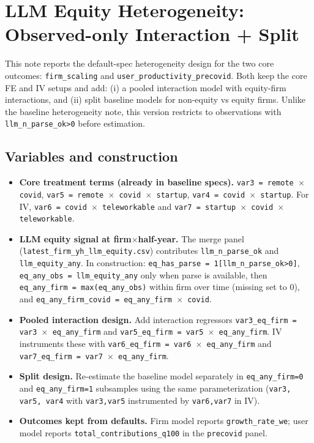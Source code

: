 \documentclass{article}
\begin{document}
\section*{LLM Equity Heterogeneity: Observed-only Interaction + Split}

This note reports the default-spec heterogeneity design for the two core outcomes:
\texttt{firm\_scaling} and \texttt{user\_productivity\_precovid}. Both keep the core FE and IV setups and add:
(i) a pooled interaction model with equity-firm interactions, and
(ii) split baseline models for non-equity vs equity firms.
Unlike the baseline heterogeneity note, this version restricts to observations with
\texttt{llm\_n\_parse\_ok>0} before estimation.

\subsection*{Variables and construction}
\begin{itemize}
  \item \textbf{Core treatment terms (already in baseline specs).}
  \texttt{var3 = remote $\times$ covid}, \texttt{var5 = remote $\times$ covid $\times$ startup},
  \texttt{var4 = covid $\times$ startup}.
  For IV, \texttt{var6 = covid $\times$ teleworkable} and
  \texttt{var7 = startup $\times$ covid $\times$ teleworkable}.

  \item \textbf{LLM equity signal at firm$\times$half-year.}
  The merge panel (\texttt{latest\_firm\_yh\_llm\_equity.csv}) contributes
  \texttt{llm\_n\_parse\_ok} and \texttt{llm\_equity\_any}.
  In construction: \texttt{eq\_has\_parse = 1[llm\_n\_parse\_ok>0]},
  \texttt{eq\_any\_obs = llm\_equity\_any} only when parse is available,
  then \texttt{eq\_any\_firm = max(eq\_any\_obs)} within firm over time
  (missing set to 0), and \texttt{eq\_any\_firm\_covid = eq\_any\_firm $\times$ covid}.

  \item \textbf{Pooled interaction design.}
  Add interaction regressors
  \texttt{var3\_eq\_firm = var3 $\times$ eq\_any\_firm} and
  \texttt{var5\_eq\_firm = var5 $\times$ eq\_any\_firm}.
  IV instruments these with
  \texttt{var6\_eq\_firm = var6 $\times$ eq\_any\_firm} and
  \texttt{var7\_eq\_firm = var7 $\times$ eq\_any\_firm}.

  \item \textbf{Split design.}
  Re-estimate the baseline model separately in
  \texttt{eq\_any\_firm=0} and \texttt{eq\_any\_firm=1} subsamples using
  the same parameterization (\texttt{var3, var5, var4} with
  \texttt{var3,var5} instrumented by \texttt{var6,var7} in IV).

  \item \textbf{Outcomes kept from defaults.}
  Firm model reports \texttt{growth\_rate\_we}; user model reports
  \texttt{total\_contributions\_q100} in the \texttt{precovid} panel.
\end{itemize}
\end{document}
